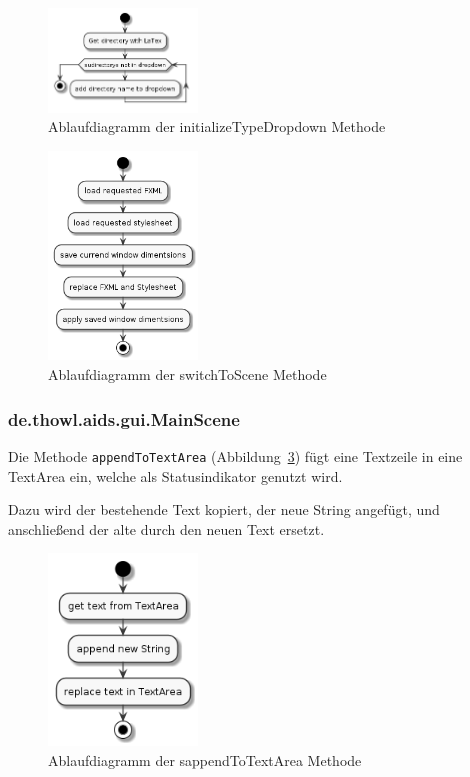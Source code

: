 \documentclass[stu, a4paper, 11pt, floatsintext]{apa7}
\begin{document}
\begin{figure}[!htbp]
\centering
\includegraphics[width=150px]{../technical_documentation/diagramm/uml/flowcharts/gui/controller/initialiseTypeDropdown.png}
\caption{\label{initializeTypeDropdown-methode}Ablaufdiagramm der initializeTypeDropdown Methode}
\end{figure}

\begin{figure}[!htbp]
\centering
\includegraphics[width=150px]{../technical_documentation/diagramm/uml/flowcharts/gui/controller/switchToScene.png}
\caption{\label{switchToScene-methode}Ablaufdiagramm der switchToScene Methode}
\end{figure}

\subsubsection{de.thowl.aids.gui.MainScene}

\noindent Die Methode \texttt{appendToTextArea} (Abbildung~\ref{appendToTextArea-methode}) fügt eine Textzeile in eine TextArea ein, welche als Statusindikator genutzt wird.

Dazu wird der bestehende Text kopiert, der neue String angefügt, und anschließend der alte durch den neuen Text ersetzt.

\begin{figure}[!htbp]
\centering
\includegraphics[width=150px]{../technical_documentation/diagramm/uml/flowcharts/gui/mainscene/appendToTextArea.png}
\caption{\label{appendToTextArea-methode}Ablaufdiagramm der sappendToTextArea Methode}
\end{figure}
\end{document}
